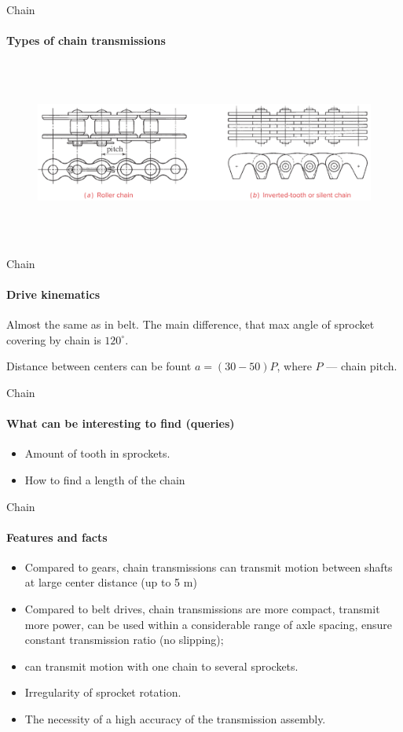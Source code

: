 \documentclass[aspectratio=169]{beamer}
\begin{document}
\begin{frame}[t]{Chain}
    \framesubtitle{Types of chain transmissions}
    \begin{figure}[H]
        \centering\includegraphics[height=6cm,width=1\textwidth,keepaspectratio]{chain_types.png}
        \label{fig:chain_types.png}
    \end{figure}
\end{frame}

\begin{frame}[t]{Chain}
    \framesubtitle{Drive kinematics}
    Almost the same as in belt. The main difference, that max angle of sprocket covering by chain is $120^\circ$.

    Distance between centers can be fount $a = (30 - 50)P$, where $P$ --- chain pitch.
\end{frame}


\begin{frame}[t]{Chain}
    \framesubtitle{What can be interesting to find (queries)}
    \begin{itemize}
        \item Amount of tooth in sprockets.
        \item How to find a length of the chain 
    \end{itemize}
\end{frame}

\begin{frame}[t]{Chain}
    \framesubtitle{Features and facts}
    \begin{itemize}
        \item Compared to gears, chain transmissions can transmit motion between shafts at large center distance (up to 5 m)
        \item Compared to belt drives, chain transmissions are more compact, transmit more power, can be used within a considerable range of axle spacing, ensure constant transmission ratio (no slipping); 
        \item can transmit motion with one chain to several sprockets. 
        \item Irregularity of sprocket rotation.
        \item The necessity of a high accuracy of the transmission assembly.
    \end{itemize}
\end{frame}
\end{document}
